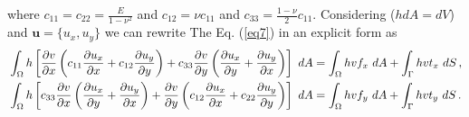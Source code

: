 \documentclass[]{article}
\begin{document}
where $c_{11}=c_{22}=\frac{E}{1-\nu^2}$ and $c_{12}=\nu c_{11}$ and $c_{33} = \frac{1-\nu}{2}c_{11}$.  Considering ($hdA=dV$)  and $\mathbf{u} = \{u_x, u_y\}$ we can rewrite The Eq. (\ref{eq7}) in an explicit form as \cite{reddy2005introduction}
\begin{equation}\label{eq10}
	\begin{aligned}[b]
		&\int_{\Omega} h \left[\frac{\partial v}{\partial x}\left(c_{11}\frac{\partial u_x}{\partial x} + c_{12}\frac{\partial u_y}{\partial y} \right) + c_{33}\frac{\partial v}{\partial y}\left(\frac{\partial u_x}{\partial y} + \frac{\partial u_y}{\partial x} \right)\right]  \ dA = 	\int_{\Omega} h v f_x \ dA + \int_{\Gamma} h v t_x \ dS \thinspace,\\
		&\int_{\Omega} h \left[c_{33}\frac{\partial v}{\partial x}\left(\frac{\partial u_x}{\partial y} + \frac{\partial u_y}{\partial x} \right) + \frac{\partial v}{\partial y}\left(c_{12}\frac{\partial u_x}{\partial x} + c_{22}\frac{\partial u_y}{\partial y} \right)\right]  \ dA = 	\int_{\Omega} h v f_y \ dA +\int_{\Gamma} h v t_y \ dS\thinspace.
	\end{aligned}
\end{equation}
\end{document}
